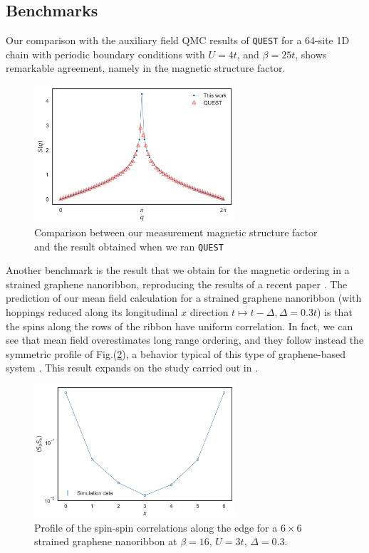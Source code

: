 \subsection{Benchmarks}
Our comparison with the auxiliary field QMC results of \texttt{QUEST} for a 64-site 1D chain with periodic boundary conditions with $U = 4 t$, and $\beta = 25 t$, shows remarkable agreement, namely in the magnetic structure factor.
\begin{figure}[H]
  \centering
  \includegraphics[width=7.5cm]{images/s_compare.png}
  \caption{Comparison between our measurement magnetic structure factor and the result obtained when we ran  \texttt{QUEST}}
  \label{figdetVSquest}
\end{figure}
Another benchmark is the result that we obtain for the magnetic ordering in a strained graphene nanoribbon, reproducing the results of a recent paper \cite{yang_strain-tuning_2017}.
The prediction of our mean field calculation for a strained graphene nanoribbon (with hoppings reduced along its longitudinal $x$ direction $t \mapsto t - \Delta, \Delta = 0.3t$) is that the spins along the rows of the ribbon have uniform correlation.
In fact, we can see that mean field overestimates long range ordering, and they follow instead the symmetric profile of Fig.(\ref{fig:corrProf}), a behavior typical of this type of graphene-based system \cite{feldner_dynamical_2011, raczkowski_interplay_2017}.
This result expands on the study carried out in \cite{yang_strain-tuning_2017}.
\begin{figure}[H]
  \centering
  \includegraphics[width = 7.5cm]{images/LongitudinalProfile.png}
  \caption{Profile of the spin-spin correlations along the edge for a $ 6 \times 6$ strained graphene nanoribbon at $\beta = 16$, $U = 3t$, $\Delta = 0.3$.}
  \label{fig:corrProf}
\end{figure}
